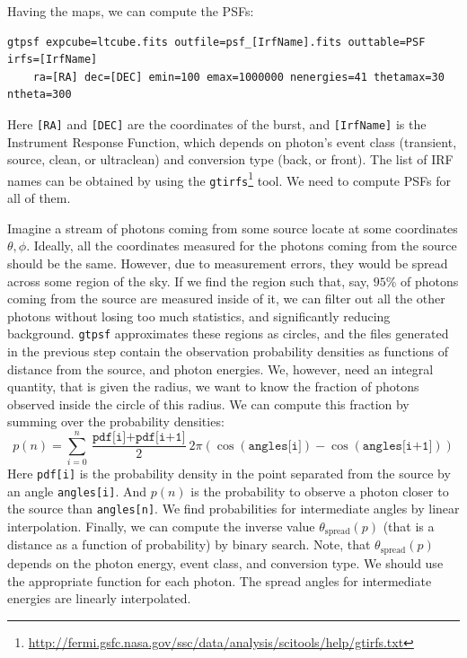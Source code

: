 \documentclass{article}
\begin{document}
Having the maps, we can compute the PSFs:
\begin{lstlisting}
gtpsf expcube=ltcube.fits outfile=psf_[IrfName].fits outtable=PSF irfs=[IrfName]
	ra=[RA] dec=[DEC] emin=100 emax=1000000 nenergies=41 thetamax=30 ntheta=300
\end{lstlisting}
Here \texttt{[RA]} and \texttt{[DEC]} are the coordinates of the burst, and \texttt{[IrfName]} is the Instrument Response Function, which depends on photon's event class (transient, source, clean, or ultraclean) and conversion type (back, or front). The list of IRF names can be obtained by using the \texttt{gtirfs}\footnote{\url{http://fermi.gsfc.nasa.gov/ssc/data/analysis/scitools/help/gtirfs.txt}} tool. We need to compute PSFs for all of them.

Imagine a stream of photons coming from some source locate at some coordinates $\theta, \phi$. Ideally, all the coordinates measured for the photons coming from the source should be the same. However, due to measurement errors, they would be spread across some region of the sky. If we find the region such that, say, $95\%$ of photons coming from the source are measured inside of it, we can filter out all the other photons without losing too much statistics, and significantly reducing background. \texttt{gtpsf} approximates these regions as circles, and the files generated in the previous step contain the observation probability densities as functions of distance from the source, and photon energies. We, however, need an integral quantity, that is given the radius, we want to know the fraction of photons observed inside the circle of this radius. We can compute this fraction by summing over the probability densities:
\begin{equation*}
	p\left(n\right) = \sum_{i=0}^{n} \frac{\texttt{pdf[i]} + \texttt{pdf[i+1]}}{2} 2\pi \left(\cos\left(\texttt{angles[i]}\right) - \cos\left(\texttt{angles[i+1]}\right)\right)
\end{equation*}
Here \texttt{pdf[i]} is the probability density in the point separated from the source by an angle \texttt{angles[i]}. And $p\left(n\right)$ is the probability to observe a photon closer to the source than \texttt{angles[n]}. We find probabilities for intermediate angles by linear interpolation. Finally, we can compute the inverse value $\theta_{\text{spread}}\left(p\right)$ (that is a distance as a function of probability) by binary search. Note, that $\theta_{\text{spread}}\left(p\right)$ depends on the photon energy, event class, and conversion type. We should use the appropriate function for each photon. The spread angles for intermediate energies are linearly interpolated.
\end{document}
